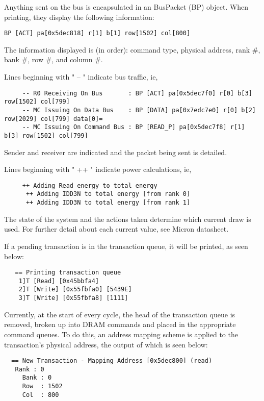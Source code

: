 \documentclass[11pt]{article}
\begin{document}
\begin{minipage}{\textwidth}
Anything sent on the bus is encapsulated in an BusPacket (BP) object. When
printing, they display the following information:
\begin{lstlisting}
BP [ACT] pa[0x5dec818] r[1] b[1] row[1502] col[800]
\end{lstlisting}
The information displayed  is (in order): command type, physical address, rank
\#, bank \#, row \#, and column \#.
\end{minipage}


\begin{minipage}{\textwidth}
Lines beginning with " -- " indicate bus traffic, ie, 
\begin{lstlisting}
     -- R0 Receiving On Bus       : BP [ACT] pa[0x5dec7f0] r[0] b[3] row[1502] col[799]
     -- MC Issuing On Data Bus    : BP [DATA] pa[0x7edc7e0] r[0] b[2] row[2029] col[799] data[0]=
     -- MC Issuing On Command Bus : BP [READ_P] pa[0x5dec7f8] r[1] b[3] row[1502] col[799]
\end{lstlisting}
Sender and receiver are indicated and the packet being sent is detailed.
\end{minipage}

Lines beginning with " ++ " indicate power calculations, ie, 
\begin{lstlisting}
     ++ Adding Read energy to total energy
      ++ Adding IDD3N to total energy [from rank 0]
      ++ Adding IDD3N to total energy [from rank 1]
\end{lstlisting}
The state of the system and the actions taken determine which current draw is used. For further detail about each current value, see Micron datasheet.  


If a pending transaction is in the transaction queue, it will be printed, as seen below:
\begin{lstlisting}
   == Printing transaction queue    
    1]T [Read] [0x45bbfa4]
    2]T [Write] [0x55fbfa0] [5439E]
    3]T [Write] [0x55fbfa8] [1111]
\end{lstlisting}
Currently, at the start of every cycle, the head of the transaction
queue is removed, broken up into DRAM commands and placed in the
appropriate command queues.  To do this, an address mapping scheme
is applied to the transaction's physical address, the output of 
which is seen below:
\begin{lstlisting}
  == New Transaction - Mapping Address [0x5dec800] (read)
   Rank : 0
     Bank : 0
     Row  : 1502
     Col  : 800
\end{lstlisting}
\end{document}
